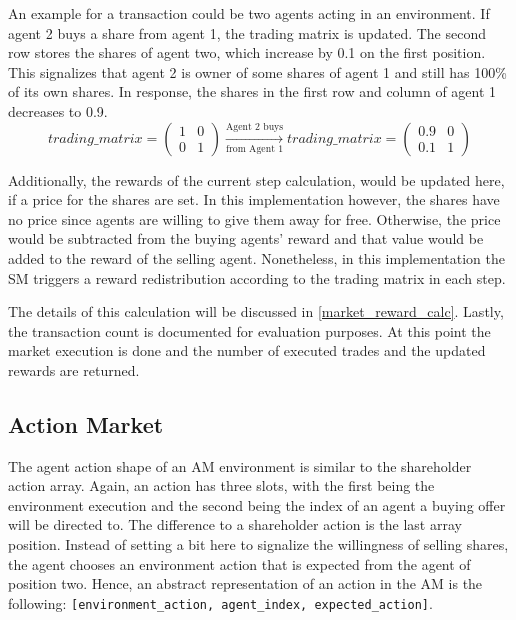 An example for a transaction could be two agents acting in an environment. If agent 2 buys a share from agent 1, the trading matrix is updated. The second row stores the shares of agent two, which increase by 0.1 on the first position. This signalizes that agent 2 is owner of some shares of agent 1 and still has 100\% of its own shares. In response, the shares in the first row and column of agent 1 decreases to 0.9.
\begin{equation*}
trading\_matrix = 
\begin{pmatrix}
1 & 0 \\
0 & 1
\end{pmatrix} \xrightarrow[\text{from Agent 1}]{\text{Agent 2 buys}} 
trading\_matrix = 
\begin{pmatrix}
0.9 & 0 \\
0.1 & 1
\end{pmatrix} 
\end{equation*}

Additionally, the rewards of the current step calculation, would be updated here, if a price for the shares are set. In this implementation however, the shares have no price since agents are willing to give them away for free. Otherwise, the price would be subtracted from the buying agents' reward and that value would be added to the reward of the selling agent. Nonetheless, in this implementation the SM triggers a reward redistribution according to the trading matrix in each step. 

The details of this calculation will be discussed in \ref{market_reward_calc}.
Lastly, the transaction count is documented for evaluation purposes. At this point the market execution is done and the number of executed trades and the updated rewards are returned.

\subsection{Action Market}
The agent action shape of an AM environment is similar to the shareholder action array. Again, an action has three slots, with the first being the environment execution and the second being the index of an agent a buying offer will be directed to. The difference to a shareholder action is the last array position. Instead of setting a bit here to signalize the willingness of selling shares, the agent chooses an environment action that is expected from the agent of position two. Hence, an abstract representation of an action in the AM is the following: \verb|[environment_action, agent_index, expected_action]|.

